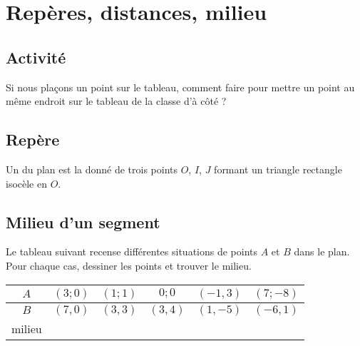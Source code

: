 \section{Repères, distances, milieu}

\subsection{Activité}

Si nous plaçons un point sur le tableau, comment faire pour mettre un point au même endroit sur le tableau de la classe d'à côté ?

\subsection{Repère}

\begin{definition}
    Un  du plan est la donné de trois points \( O\), \( I\), \( J\) formant un triangle rectangle isocèle en  \( O\).
\end{definition}


\subsection{Milieu d'un segment}

\begin{example}
    Le tableau suivant recense différentes situations de points \( A\) et \( B\) dans le plan. Pour chaque cas, dessiner les points et trouver le milieu.

    \begin{center}
        \begin{tabular}[h]{|c||c|c|c|c|c|}
            \hline
            \( A\)&\( (3;0)\)&\( (1;1)\)&\( 0;0\)&\( (-1,3)\)&\( (7;-8)\)\\
            \hline
            \( B\)&\( (7,0)\)&\( (3,3)\)&\( (3,4)\)&\( (1,-5)\)&\( (-6,1)\)\\
            \hline\hline
            milieu&&&&&\\
            \hline
        \end{tabular}
    \end{center}
\end{example}


